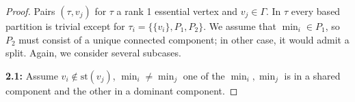 \documentclass[a4paper]{amsart}
\newcommand{\G}{\Gamma}
\newcommand{\B}{\mathcal{B}}
\newcommand{\st}{\mathrm{st}}
\theoremstyle{definition}
\theoremstyle{remark}
\begin{document}
\begin{proof}



            
            
         
 


\noindent %


 Pairs $(\tau,v_j)$ for $\tau$ a rank 1 essential vertex and $v_j\in\G$. In $\tau$ every based partition is trivial except for  $\tau_i=\{\{v_i\},P_1,P_2\}$. We  assume that   $\min_i\in P_1$, so $P_2$ must consist of a unique connected component; in other case, it would admit a split. Again, we consider several subcases. 

{\textbf{2.1:}}  Assume $v_i\notin \st (v_j)$,  $\min_i\neq\min_j$ one of the $\min_i,\min_j$ is in a shared component and the other in a dominant component.


\end{proof}
\end{document}
